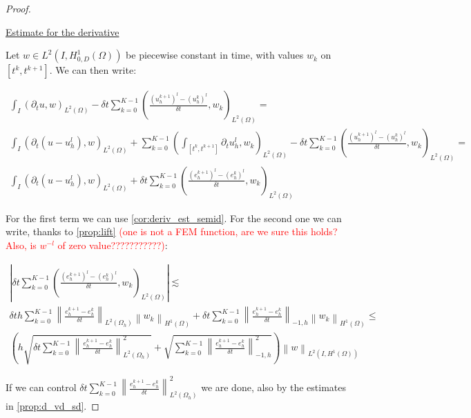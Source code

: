 \documentclass[english,a4paper,10pt,oneside]{scrbook}	%
\theoremstyle{break}
\newenvironment{mproof}[1][\proofname]{%
  \begin{proof}[#1]$ $\par\nobreak\ignorespaces
}{%
  \end{proof}
}
\renewcommand*{\proofname}{Proof}
\theoremstyle{remark}
\newcommand{\ds}{\displaystyle}
\newcommand{\norm}[1]{\left\lVert#1\right\rVert}
\begin{document}
\begin{mproof}

\underline{Estimate for the derivative}

Let $w \in L^2(I,H^1_{0,D}(\Omega))$ be piecewise constant in time, with values $w_k$ on $[t^k,t^{k+1}]$. We can then write:

\begin{align*}
	\int_I (\partial_t u , w)_{L^2(\Omega)}-\delta t \sum_{k=0}^{K-1}\left ( \frac{(u^{k+1}_h)^l - (u_h^k)^l}{\delta t} , w_k\right )_{L^2(\Omega)} = \\
	\int_I (\partial_t (u-u_h^l) , w)_{L^2(\Omega)} + \sum_{k=0}^{K-1} \left (\int_{[t^k,t^{k+1}]} \partial_t u_h^l , w_k\right )_{L^2(\Omega)} -\delta t \sum_{k=0}^{K-1}\left ( \frac{(u^{k+1}_h)^l - (u_h^k)^l}{\delta t} , w_k\right )_{L^2(\Omega)} = \\
	\int_I (\partial_t (u-u_h^l) , w)_{L^2(\Omega)} + \delta t \sum_{k=0}^{K-1}\left ( \frac{(e^{k+1}_h)^l - (e_h^k)^l}{\delta t} , w_k\right )_{L^2(\Omega)}
\end{align*}

For the first term we can use \cref{cor:deriv_est_semid}. For the second one we can write, thanks to \cref{prop:lift} \textcolor{red}{(one is not a FEM function, are we sure this holds? Also, is $w^{-l}$ of zero value???????????)}:

\begin{align*}
	\left | \delta t \sum_{k=0}^{K-1}\left ( \frac{(e^{k+1}_h)^l - (e_h^k)^l}{\delta t} , w_k\right )_{L^2(\Omega)}\right | \lesssim \\
	\delta t h \sum_{k=0}^{K-1}\norm{ \frac{e^{k+1}_h - e_h^k}{\delta t}}_{L^2(\Omega_h)} \norm{w_k}_{H^1(\Omega)} + \delta t \sum_{k=0}^{K-1}\norm{ \frac{e^{k+1}_h - e_h^k}{\delta t}}_{-1,h} \norm{w_k}_{H^1(\Omega)} \leq \\
	\left ( h\sqrt{\delta t \sum_{k=0}^{K-1}  \norm{ \frac{e^{k+1}_h - e_h^k}{\delta t}}_{L^2(\Omega_h)}^2}  + \sqrt{ \sum_{k=0}^{K-1}\norm{ \frac{e^{k+1}_h - e_h^k}{\delta t}}_{-1,h}^2}\right ) \norm{w}_{L^2(I,H^1(\Omega))}
\end{align*}

If we can control $\ds \delta t \sum_{k=0}^{K-1} \norm{ \frac{e^{k+1}_h - e_h^k}{\delta t}}_{L^2(\Omega_h)}^2$ we are done, also by the estimates in \cref{prop:d_vd_sd}. 


\end{mproof}
\end{document}
